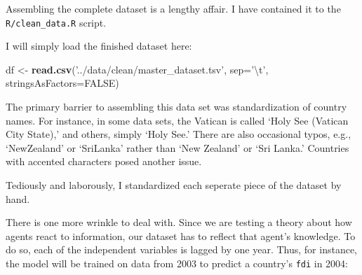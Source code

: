 \documentclass[11pt,]{article}
\newenvironment{Shaded}{\begin{snugshade}}{\end{snugshade}}
\newcommand{\CharTok}[1]{\textcolor[rgb]{0.31,0.60,0.02}{#1}}
\newcommand{\DataTypeTok}[1]{\textcolor[rgb]{0.13,0.29,0.53}{#1}}
\newcommand{\KeywordTok}[1]{\textcolor[rgb]{0.13,0.29,0.53}{\textbf{#1}}}
\newcommand{\NormalTok}[1]{#1}
\newcommand{\OperatorTok}[1]{\textcolor[rgb]{0.81,0.36,0.00}{\textbf{#1}}}
\newcommand{\OtherTok}[1]{\textcolor[rgb]{0.56,0.35,0.01}{#1}}
\newcommand{\StringTok}[1]{\textcolor[rgb]{0.31,0.60,0.02}{#1}}
\begin{document}
Assembling the complete dataset is a lengthy affair. I have contained it
to the \texttt{R/clean\_data.R} script.

I will simply load the finished dataset here:

\begin{Shaded}
\begin{Highlighting}[]
\NormalTok{df <-}\StringTok{ }\KeywordTok{read.csv}\NormalTok{(}\StringTok{'../data/clean/master_dataset.tsv'}\NormalTok{, }\DataTypeTok{sep=}\StringTok{'}\CharTok{\textbackslash{}t}\StringTok{'}\NormalTok{, }
               \DataTypeTok{stringsAsFactors=}\OtherTok{FALSE}\NormalTok{)}
\end{Highlighting}
\end{Shaded}

The primary barrier to assembling this data set was standardization of
country names. For instance, in some data sets, the Vatican is called
`Holy See (Vatican City State),' and others, simply `Holy See.' There
are also occasional typos, e.g., `NewZealand' or `SriLanka' rather than
`New Zealand' or `Sri Lanka.' Countries with accented characters posed
another issue.

Tediously and laborously, I standardized each seperate piece of the
dataset by hand.

There is one more wrinkle to deal with. Since we are testing a theory
about how agents react to information, our dataset has to reflect that
agent's knowledge. To do so, each of the independent variables is lagged
by one year. Thus, for instance, the model will be trained on data from
2003 to predict a country's \texttt{fdi} in 2004:

\begin{Shaded}
\end{Shaded}
\end{document}
